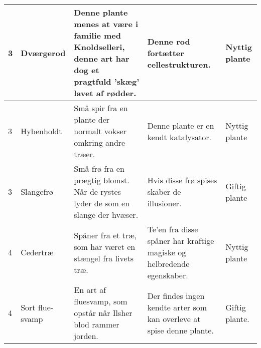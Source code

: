 \begin{center}
\begin{longtable}{|p{}|p{}|p{}|p{}|p{}|}
3 & Dværgerod & Denne plante menes at være i familie med Knoldselleri, denne art har dog et pragtfuld 'skæg' lavet af rødder. & Denne rod fortætter cellestrukturen. & Nyttig plante \\\hline

3 & Hybenholdt & Små spir fra en plante der normalt vokser omkring andre træer. & Denne plante er en kendt katalysator. & Nyttig plante \\\hline

3 & Slangefrø & Små frø fra en prægtig blomst. Når de rystes lyder de som en slange der hvæser. & Hvis disse frø spises skaber de illusioner. & Giftig plante \\\hline

4 & Cedertræ & Spåner fra et træ, som har været en stængel fra livets træ. & Te'en fra disse spåner har kraftige magiske og helbredende egenskaber. & Nyttig plante\\\hline

4 & Sort flue-svamp & En art af fluesvamp, som opstår når Ilsher blod rammer jorden. & Der findes ingen kendte arter som kan overleve at spise denne plante. & Giftig plante.\\\hline

\end{longtable}
\end{center}
